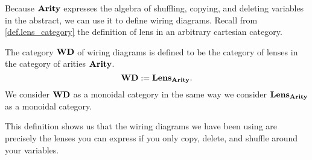 \documentclass[DynamicalBook]{subfiles}
\begin{document}
Because $\textbf{Arity}$ expresses the algebra of shuffling, copying, and deleting
variables in the abstract, we can use it to define wiring diagrams. Recall from \cref{def.lens_category} the definition of lens in an arbitrary cartesian category.

\begin{definition}\label{def.category_of_wiring_diagrams}
  The category $\textbf{WD}$ of wiring diagrams is defined to be the category of
  lenses in the category of arities $\textbf{Arity}$.
  $$\textbf{WD} := \textbf{Lens}_{\textbf{Arity}}.$$
We consider $\textbf{WD}$ as a monoidal category in the same way we consider
$\textbf{Lens}_{\textbf{Arity}}$ as a monoidal category.
\end{definition}

This definition shows us that the wiring diagrams we have been using are
precisely the lenses you can express if you only copy, delete, and shuffle
around your variables.
\end{document}
